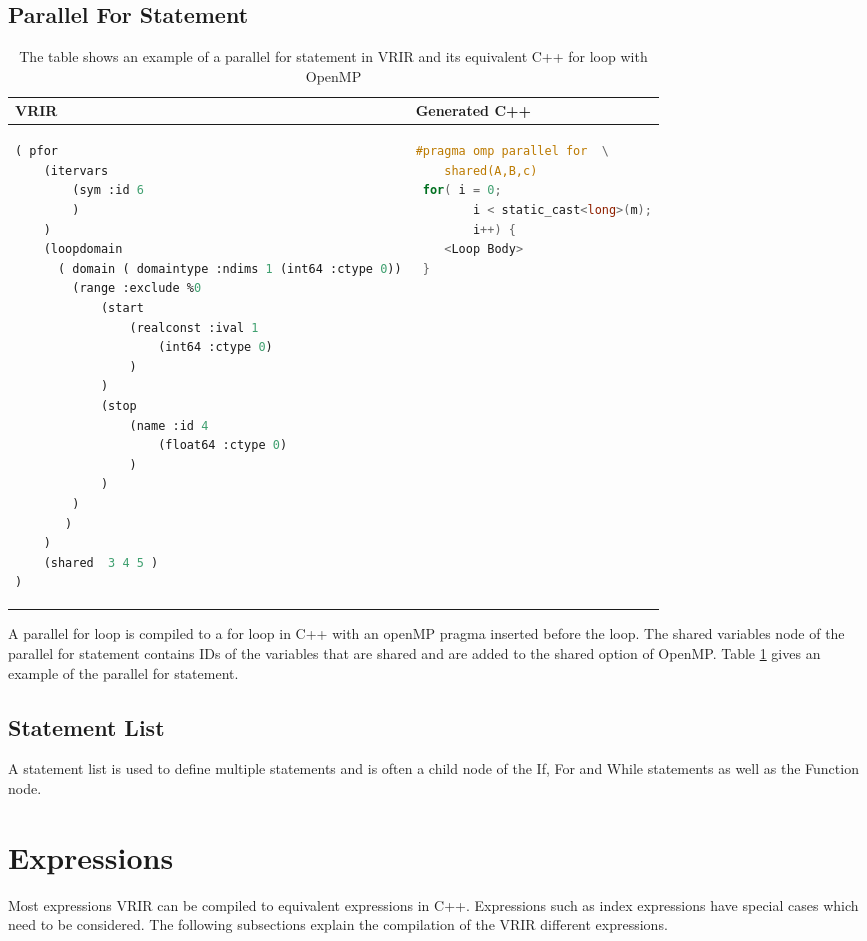 \subsection{Parallel For Statement}
\begin{table}[htbp]
\centering
\begin{tabular}{|l|l|}
\hline

VRIR &  Generated C++ \\
\hline
{
\begin{lstlisting}[language=lisp,frame=none, numbers=none]
( pfor
	(itervars 
		(sym :id 6 
		)
	)
	(loopdomain 
	  ( domain ( domaintype :ndims 1 (int64 :ctype 0))
		(range :exclude %0 
   			(start  
   				(realconst :ival 1
					(int64 :ctype 0)
				)
			)
			(stop  
   				(name :id 4 
					(float64 :ctype 0)
				)
			)
		)
	   )
	)
	(shared  3 4 5 )
)
\end{lstlisting}
}
&
{
\begin{lstlisting}[language=c,frame=none, numbers=none]
#pragma omp parallel for  \
	shared(A,B,c)
 for( i = 0; 
		i < static_cast<long>(m);
		i++) {
	<Loop Body>
 }

\end{lstlisting}
} \\
\hline
\end{tabular}
\caption[Parallel For example]{The table shows an example of a parallel for statement in VRIR and its equivalent C++ for loop with OpenMP}
\label{tab:pForStmt}
\end{table}
A parallel for loop is compiled to a for loop  in C++ with an openMP pragma inserted before the loop. The shared variables node of the parallel for statement contains IDs of the variables that are shared and are added to the shared option of OpenMP. Table \ref{tab:pForStmt} gives an example of the parallel for statement.
\subsection{Statement List}
A statement list is used to define multiple statements and is often a child node of the If, For and While statements as well as the Function node.
\section{Expressions}
Most expressions VRIR can be compiled to equivalent expressions in C++. Expressions such as index expressions have special cases which need to be considered. The following subsections explain the compilation of the VRIR different expressions.
